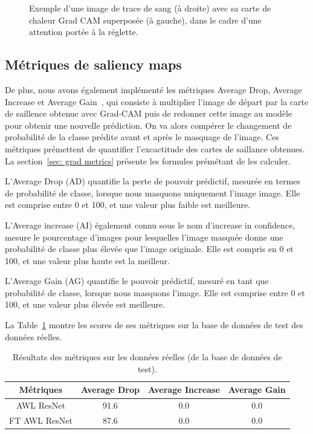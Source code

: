 \begin{figure}[ht]
\begin{subfigure}{0.40\linewidth}
    \end{subfigure}
    \caption{Exemple d'une image de trace de sang (à droite) avec sa carte de chaleur Grad CAM superposée (à gauche), dans le cadre d'une attention portée à la réglette.}
    \label{fig:grad_cam reglette}
\end{figure}

\subsection{Métriques de saliency maps}
De plus, nous avons également implémenté les métriques Average Drop, Average Increase et Average Gain~\cite{opticam}, qui consiste à multiplier l'image de départ par la carte de saillence obtenue avec Grad-CAM puis de redonner cette image au modèle
pour obtenir une nouvelle prédiction. On va alors compérer le changement de probabilité de la classe prédite avant et après le masquage de l'image. Ces métriques prémettent de quantifier l'excactitude des cartes de saillance obtenues. La section~\ref{sec: grad metrics} présente les formules prémétant de les calculer.

L'Average Drop (AD) quantifie la perte de pouvoir prédictif, mesurée en termes de probabilité de classe, lorsque nous masquons uniquement l'image image. Elle est comprise entre 0 et 100, et une valeur plus faible est meilleure.

L'Average increase (AI) également connu sous le nom d'increase in confidence, mesure le pourcentage d'images pour lesquelles l'image masquée donne une probabilité de classe plus élevée que l'image originale. Elle est compris en 0 et 100, et une valeur plus haute est la meilleur.

L'Average Gain (AG) quantifie le pouvoir prédictif, mesuré en tant que probabilité de classe, lorsque nous masquons l'image. Elle est comprise entre 0 et 100, et une valeur plus élevée est meilleure.

La Table~\ref{tab:saliency_results} montre les scores de ses métriques sur la base de données de test des données réelles.

\begin{table}[ht]
    \centering
    \begin{tabular}{cccc}
        \toprule
        Métriques & Average Drop & Average Increase & Average Gain \\
        \midrule
        AWL ResNet & 91.6 & 0.0& 0.0\\
        FT AWL ResNet & 87.6 & 0.0 & 0.0\\
        \bottomrule
        \end{tabular}
    \caption{Résultats des métriques sur les données réelles (de la base de données de test).}
    \label{tab:saliency_results}
\end{table}

